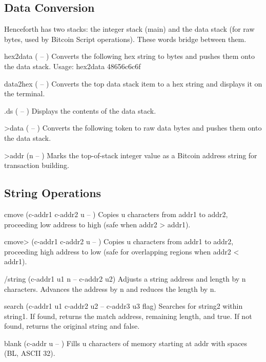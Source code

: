 \documentclass[a4paper, 11pt, openany]{book}
\begin{document}
\subsection{Data Conversion}

Henceforth has two stacks: the integer stack (main) and the data stack (for raw bytes, used by Bitcoin Script operations). These words bridge between them.

\begin{forthbox}
  hex2data    ( -- )
              Converts the following hex string to bytes and
              pushes them onto the data stack.
              Usage: hex2data 48656c6c6f

  data2hex    ( -- )
              Converts the top data stack item to a hex string
              and displays it on the terminal.

  .ds         ( -- )
              Displays the contents of the data stack.

  >data       ( -- )
              Converts the following token to raw data bytes and
              pushes them onto the data stack.

  >addr       (n -- )
              Marks the top-of-stack integer value as a Bitcoin
              address string for transaction building.
\end{forthbox}

\subsection{String Operations}

\begin{forthbox}
  cmove       (c-addr1 c-addr2 u -- )
              Copies u characters from addr1 to addr2, proceeding
              low address to high (safe when addr2 > addr1).

  cmove>      (c-addr1 c-addr2 u -- )
              Copies u characters from addr1 to addr2, proceeding
              high address to low (safe for overlapping regions
              when addr2 < addr1).

  /string     (c-addr1 u1 n -- c-addr2 u2)
              Adjusts a string address and length by n characters.
              Advances the address by n and reduces the length by
              n.

  search      (c-addr1 u1 c-addr2 u2 -- c-addr3 u3 flag)
              Searches for string2 within string1. If found,
              returns the match address, remaining length, and
              true. If not found, returns the original string and
              false.

  blank       (c-addr u -- )
              Fills u characters of memory starting at addr with
              spaces (BL, ASCII 32).
\end{forthbox}
\end{document}
